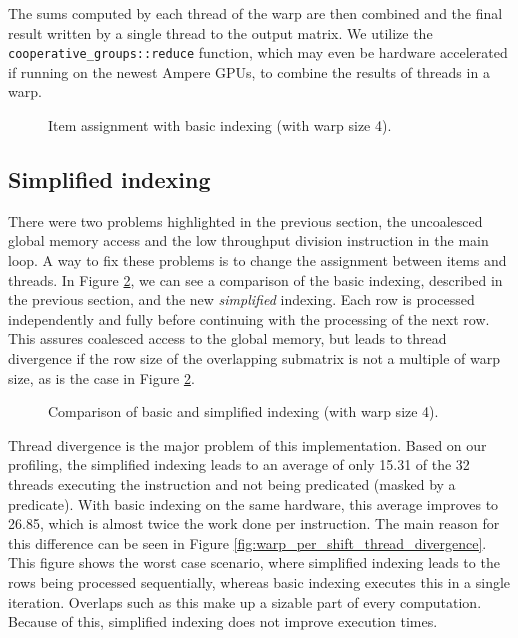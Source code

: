 The sums computed by each thread of the warp are then combined and the final result written by a single thread to the output matrix. We utilize the \texttt{cooperative\_groups::reduce} function, which may even be hardware accelerated if running on the newest Ampere GPUs, to combine the results of threads in a warp.

\begin{figure}[ht]
	\centering
	\def\svgwidth{0.25\textwidth}
	
	\caption{Item assignment with basic indexing (with warp size 4).}
	\label{fig:warp_per_shift_normal_indexing}
\end{figure}


\subsection{Simplified indexing}

There were two problems highlighted in the previous section, the uncoalesced global memory access and the low throughput division instruction in the main loop. A way to fix these problems is to change the assignment between items and threads. In Figure \ref{fig:warp_per_shift_simplified_indexing}, we can see a comparison of the basic indexing, described in the previous section, and the new \textit{simplified} indexing. Each row is processed independently and fully before continuing with the processing of the next row. This assures coalesced access to the global memory, but leads to thread divergence if the row size of the overlapping submatrix is not a multiple of warp size, as is the case in Figure \ref{fig:warp_per_shift_simplified_indexing}.

\begin{figure}[ht]
	\centering
	\def\svgwidth{0.4\textwidth}
	
	\caption{Comparison of basic and simplified indexing (with warp size 4).}
	\label{fig:warp_per_shift_simplified_indexing}
\end{figure}

Thread divergence is the major problem of this implementation. Based on our profiling, the simplified indexing leads to an average of only 15.31 of the 32 threads executing the instruction and not being predicated (masked by a predicate). With basic indexing on the same hardware, this average improves to 26.85, which is almost twice the work done per instruction. The main reason for this difference can be seen in Figure \ref{fig:warp_per_shift_thread_divergence}. This figure shows the worst case scenario, where simplified indexing leads to the rows being processed sequentially, whereas basic indexing executes this in a single iteration. Overlaps such as this make up a sizable part of every computation. Because of this, simplified indexing does not improve execution times.


